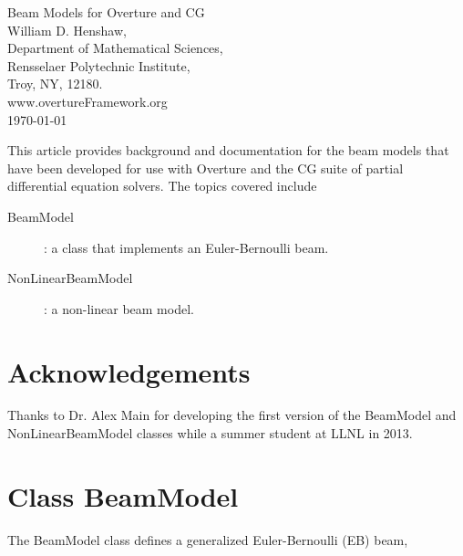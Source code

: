 \documentclass[11pt]{article}
\begin{document}
\baselineskip
\begin{flushleft}
{\LARGE Beam Models for Overture and CG} \\
\vspace{2\baselineskip}
William D. Henshaw, \\
Department of Mathematical Sciences, \\
Rensselaer Polytechnic Institute,     \\
Troy, NY, 12180.  \\

www.overtureFramework.org \\
\vspace{2\baselineskip}
\today
\vspace{4\baselineskip}
% 
\end{flushleft}
%
%
 This article provides background and documentation for
the beam models that have been developed for use with Overture and the CG suite of partial differential
equation solvers. The topics covered include
\begin{description}
  \item[BeamModel] : a class that implements an Euler-Bernoulli beam.
  \item[NonLinearBeamModel] : a non-linear beam model.
\end{description}


\clearpage
\tableofcontents
\section{Acknowledgements}

Thanks to Dr. Alex Main for developing the first version of the BeamModel and NonLinearBeamModel classes while
a summer student at LLNL in 2013.

\section{Class BeamModel}\label{sec:BeamModel}

The BeamModel class defines a generalized Euler-Bernoulli (EB) beam,
\end{document}

